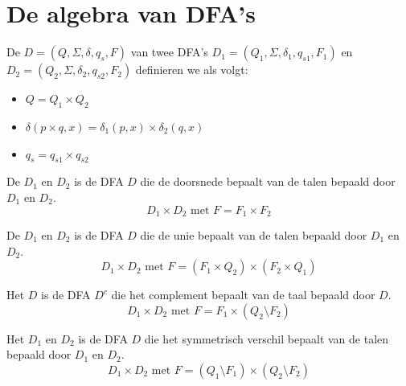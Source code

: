 \documentclass[main.tex]{subfiles}
\begin{document}


\section{De algebra van DFA's}
\label{sec:de-algebra-van-DFAs}

\begin{de}
  De  $D = (Q,\Sigma, \delta, q_{s},F)$ van twee DFA's $D_{1} = (Q_{1},\Sigma, \delta_{1}, q_{s1},F_{1})$ en $D_{2} = (Q_{2},\Sigma, \delta_{2}, q_{s2},F_{2})$ definieren we als volgt:
  \begin{itemize}
  \item $Q = Q_{1}\times Q_{2}$
  \item $\delta(p\times q,x) = \delta_{1}(p,x) \times \delta_{2}(q,x)$
  \item $q_{s} = q_{s1} \times q_{s2}$
  \end{itemize}
\end{de}

\begin{de}
  De  $D_{1}$ en $D_{2}$ is de DFA $D$ die de doorsnede bepaalt van de talen bepaald door $D_{1}$ en $D_{2}$.
  \[ D_{1} \times D_{2} \text{ met } F = F_{1} \times F_{2} \]
\end{de}

\begin{de}
  De  $D_{1}$ en $D_{2}$ is de DFA $D$ die de unie bepaalt van de talen bepaald door $D_{1}$ en $D_{2}$.
  \[ D_{1} \times D_{2} \text{ met } F = (F_{1}\times Q_{2}) \times (F_{2} \times Q_{1}) \]
\end{de}

\begin{de}
  Het  $D$ is de DFA $D^{c}$ die het complement bepaalt van de taal bepaald door $D$.
  \[ D_{1} \times D_{2} \text{ met } F = F_{1} \times (Q_{2}\setminus F_{2}) \]
\end{de}

\begin{de}
  Het  $D_{1}$ en $D_{2}$ is de DFA $D$ die het symmetrisch verschil bepaalt van de talen bepaald door $D_{1}$ en $D_{2}$.
  \[ D_{1} \times D_{2} \text{ met } F = (Q_{1}\setminus F_{1}) \times (Q_{2}\setminus F_{2}) \]
\end{de}




\end{document}
